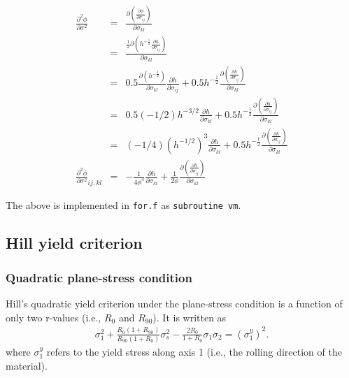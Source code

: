 \documentclass[12pt]{amsart}
\begin{document}
\begin{eqnarray}
  \label{eq:d2phiVM}
  \frac{\partial^2\phi}{\partial\sigma^2}&=&\frac{  \partial{(\frac{\partial \phi}{\partial\sigma_{ij}})  }     }{\partial \sigma_{kl}}\\
  &=&\frac{ \frac{1}{2}  \partial{(  h^{-\frac{1}{2}}\frac{\partial h}{\partial \sigma_{ij}}   )}}{\partial \sigma_{kl}}\\
  &=& 0.5  \frac{\partial(h^{-\frac{1}{2}})}{\partial\sigma_{kl}} \frac{\partial h}{\partial \sigma_{ij}}   + 0.5 h^{-\frac{1}{2}}  \frac{\partial(  \frac{\partial h}{\partial \sigma_{ij}}   )}{\partial\sigma_{kl}}\\
  &=& 0.5  (-1/2)h^{-3/2} \frac{\partial h}{\partial\sigma_{kl}}  + 0.5 h^{-\frac{1}{2}}  \frac{\partial(  \frac{\partial h}{\partial \sigma_{ij}}   )}{\partial\sigma_{kl}}\\
  &=& (-1/4) (h^{-1/2})^3 \frac{\partial h}{\partial\sigma_{kl}}  + 0.5 h^{-\frac{1}{2}}  \frac{\partial(  \frac{\partial h}{\partial \sigma_{ij}}   )}{\partial\sigma_{kl}}\\
  \frac{\partial^2\phi}{\partial\sigma^2}_{ij,kl}&=& - \frac{1}{4\phi^3} \frac{\partial h}{\partial\sigma_{kl}}  + \frac{1}{2\phi}  \frac{\partial(  \frac{\partial h}{\partial \sigma_{ij}}   )}{\partial\sigma_{kl}}
\end{eqnarray}

The above is implemented in \verb|for.f| as \verb|subroutine vm|.

\subsection{Hill yield criterion}
\subsubsection{Quadratic plane-stress condition}
Hill's quadratic yield criterion under the plane-stress condition is a function of only two r-values (i.e., $R_0$ and $R_{90}$).
It is written as
\begin{eqnarray}
  \label{eq:hillquad}
  \sigma_{1}^2 + \frac{R_0 (1 + R_{90})}{R_{90}(1+R_0)}\sigma_s^2-\frac{2R_0}{1+R_0}\sigma_1\sigma_2=(\sigma_1^y)^2.
\end{eqnarray}
where $\sigma^y_1$ refers to the yield stress along axis 1 (i.e., the rolling direction of the material).
\end{document}
